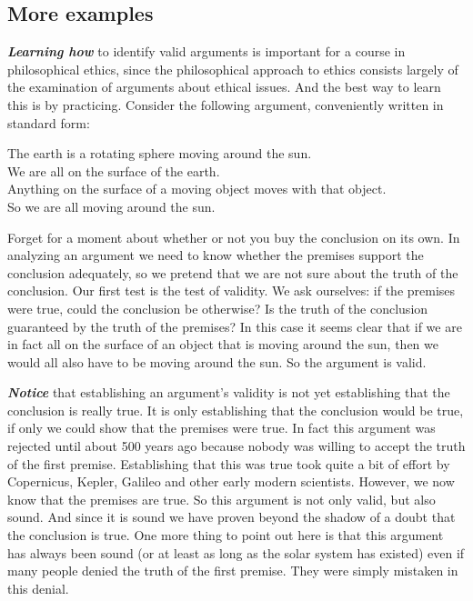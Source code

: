 \documentclass[12pt, openany]{book}
\begin{document}
\hypertarget{more-examples}{%
\subsection*{More examples}\label{more-examples}}


\textbf{\emph{Learning how}} to identify valid arguments is important for a course in philosophical ethics, since the philosophical approach to ethics consists largely of the examination of arguments about ethical issues. And the best way to learn this is by practicing. Consider the following argument, conveniently written in standard form:

\begin{center}

\begin{argument}

The earth is a rotating sphere moving around the sun.\\
We are all on the surface of the earth.\\
Anything on the surface of a moving object moves with that object.\\

So we are all moving around the sun.

\end{argument}

\end{center}

Forget for a moment about whether or not you buy the conclusion on its own. In analyzing an argument we need to know whether the premises support the conclusion adequately, so we pretend that we are not sure about the truth of the conclusion. Our first test is the test of validity. We ask ourselves: if the premises were true, could the conclusion be otherwise? Is the truth of the conclusion guaranteed by the truth of the premises? In this case it seems clear that if we are in fact all on the surface of an object that is moving around the sun, then we would all also have to be moving around the sun. So the argument is valid.

\textbf{\emph{Notice}} that establishing an argument's validity is not yet establishing that the conclusion is really true. It is only establishing that the conclusion would be true, if only we could show that the premises were true. In fact this argument was rejected until about 500 years ago because nobody was willing to accept the truth of the first premise. Establishing that this was true took quite a bit of effort by Copernicus, Kepler, Galileo and other early modern scientists. However, we now know that the premises are true. So this argument is not only valid, but also sound. And since it is sound we have proven beyond the shadow of a doubt that the conclusion is true. One more thing to point out here is that this argument has always been sound (or at least as long as the solar system has existed) even if many people denied the truth of the first premise. They were simply mistaken in this denial.
\end{document}

